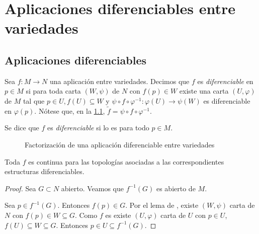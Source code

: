 \documentclass[../VD.tex]{subfiles}
\begin{document}
\setcounter{chapter}{1}
\chapter{Aplicaciones diferenciables entre variedades}
\label{chap:app}

\section{Aplicaciones diferenciables}
\label{sec:app-dif}

\begin{definition}[diferenciable]
  \label{def:diferenciable}
  Sea \(f \colon M \to N\) una aplicación entre variedades. Decimos que \(f\) es
  \emph{diferenciable} en \(p \in M\) si para toda carta \((W,\psi)\) de \(N\)
  con \(f(p) \in W\) existe una carta \((U,\varphi)\) de \(M\) tal que \(p \in
  U, f(U) \subseteq W\) y \(\psi \circ f \circ \varphi^{-1} \colon \varphi(U)
  \to \psi(W)\) es diferenciable en \(\varphi(p)\). Nótese que, en la
  \cref{fig:factorizacion-diferenciable}, \(\widetilde{f} = \psi \circ f \circ
  \varphi^{-1}\).

  Se dice que \(f\) es \emph{diferenciable} si lo es para todo \(p \in M\).
\end{definition}

\begin{figure}[h]
  \centering
  \caption{Factorización de una aplicación diferenciable entre variedades}
  \label{fig:factorizacion-diferenciable}
\end{figure}

\begin{lemma}
  \label{lem:dif-implies-cont}
  Toda \(f\)  es continua para las topologías
  asociadas a las correspondientes estructuras diferenciables.
\end{lemma}

\begin{proof}
  Sea \(G \subset N\) abierto. Veamos que \(f^{-1}(G)\) es abierto de \(M\).

  Sea \(p \in f^{-1}(G)\). Entonces \(f(p) \in G\). Por el
  lema de , existe
  \((W,\psi)\) carta de \(N\) con \(f(p) \in W \subseteq G\). Como \(f\) es
   existe \((U,\varphi)\) carta de \(U\) con \(p \in
  U\), \(f(U) \subseteq W \subseteq G\). Entonces \(p \in U \subseteq
  f^{-1}(G)\). 
\end{proof}
\end{document}
